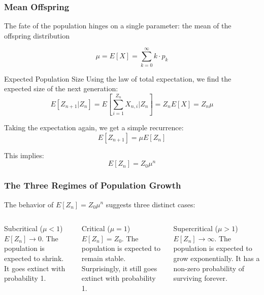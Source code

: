 \documentclass[aspectratio=169]{beamer}\usepackage[]{graphicx}\usepackage[]{xcolor}
\begin{document}
\begin{frame}
    \frametitle{Mean Offspring}

    The fate of the population hinges on a single parameter: the mean of the offspring distribution

    $$ \mu = E[X] = \sum_{k=0}^{\infty} k \cdot p_k $$

    \begin{block}{Expected Population Size}
        Using the law of total expectation, we find the expected size of the next generation:
        $$ E[Z_{n+1} | Z_n] = E\left[\sum_{i=1}^{Z_n} X_{n,i} \bigg| Z_n\right] = Z_n E[X] = Z_n \mu $$

        Taking the expectation again, we get a simple recurrence:
        $$ E[Z_{n+1}] = \mu E[Z_n] $$

        This implies:
        $$ E[Z_n] = Z_0 \mu^n $$
    \end{block}
\end{frame}

\begin{frame}
    \frametitle{The Three Regimes of Population Growth}

    The behavior of $E[Z_n] = Z_0 \mu^n$ suggests three distinct cases:

    \begin{columns}[T]
        \begin{column}{0.33\textwidth}
            \begin{block}{Subcritical ($\mu < 1$)}
                $E[Z_n] \to 0$. The population is expected to shrink. It goes extinct with probability 1.
            \end{block}
        \end{column}
        \begin{column}{0.33\textwidth}
            \begin{block}{Critical ($\mu = 1$)}
                $E[Z_n] = Z_0$. The population is expected to remain stable. Surprisingly, it still goes extinct with probability 1.
            \end{block}
        \end{column}
        \begin{column}{0.33\textwidth}
            \begin{block}{Supercritical ($\mu > 1$)}
                $E[Z_n] \to \infty$. The population is expected to grow exponentially. It has a non-zero probability of surviving forever.
            \end{block}
        \end{column}
    \end{columns}
\end{frame}
\end{document}
